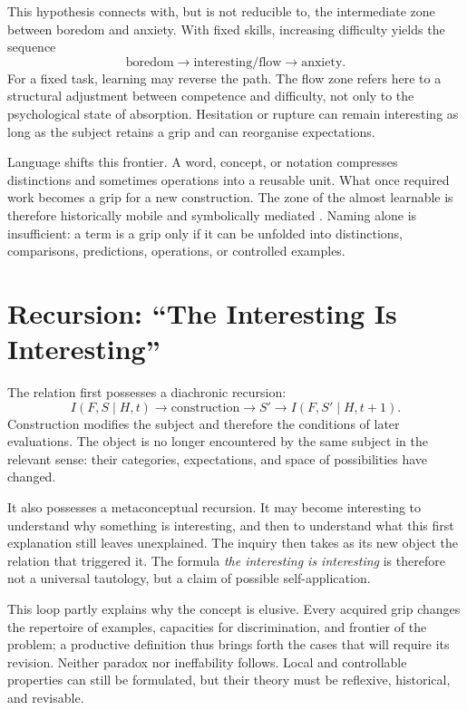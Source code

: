 \documentclass[11pt,a4paper]{article}
\begin{document}
This hypothesis connects with, but is not reducible to, the intermediate zone
between boredom and anxiety. With fixed skills, increasing difficulty yields
the sequence
\[
  \text{boredom}\longrightarrow\text{interesting/flow}
  \longrightarrow\text{anxiety}.
\]
For a fixed task, learning may reverse the path. The flow zone refers here to a
structural adjustment between competence and difficulty, not only to the
psychological state of absorption. Hesitation or rupture can remain interesting
as long as the subject retains a grip and can reorganise expectations.

Language shifts this frontier. A word, concept, or notation compresses
distinctions and sometimes operations into a reusable unit. What once required
work becomes a grip for a new construction. The zone of the almost learnable is
therefore historically mobile and symbolically mediated
\parencite{vygotsky1978mind,lenat1991thresholds,lenat2008turtle,koestler1989act,steels2005coordinating,steels2015talkingheads}.
Naming alone is insufficient: a term is a grip only if it can be unfolded into
distinctions, comparisons, predictions, operations, or controlled examples.

\section{Recursion: ``The Interesting Is Interesting''}

The relation first possesses a diachronic recursion:
\[
  I(F,S\mid H,t)\longrightarrow
  \text{construction}\longrightarrow S'
  \longrightarrow I(F,S'\mid H,t+1).
\]
Construction modifies the subject and therefore the conditions of later
evaluations. The object is no longer encountered by the same subject in the
relevant sense: their categories, expectations, and space of possibilities
have changed.

It also possesses a metaconceptual recursion. It may become interesting to
understand why something is interesting, and then to understand what this first
explanation still leaves unexplained. The inquiry then takes as its new object
the relation that triggered it. The formula \emph{the interesting is
interesting} is therefore not a universal tautology, but a claim of possible
self-application.

This loop partly explains why the concept is elusive. Every acquired grip
changes the repertoire of examples, capacities for discrimination, and frontier
of the problem; a productive definition thus brings forth the cases that will
require its revision. Neither paradox nor ineffability follows. Local and
controllable properties can still be formulated, but their theory must be
reflexive, historical, and revisable.
\end{document}
